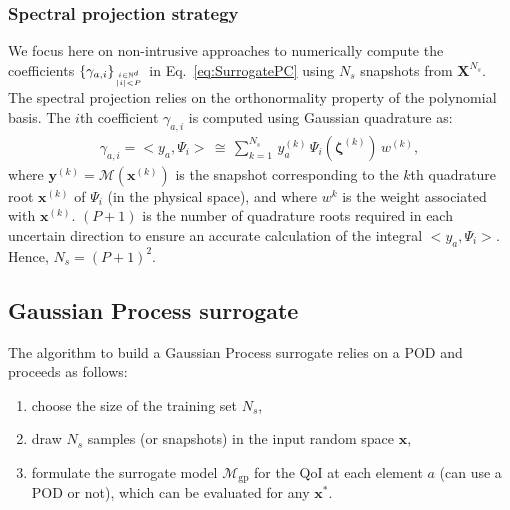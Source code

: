 \subsubsection{Spectral projection strategy}

We focus here on non-intrusive approaches to numerically compute the coefficients $\lbrace\gamma_{a,i}\rbrace_{i\in\mathbb{N}^d\atop |i|<P}$  in Eq.~\eqref{eq:SurrogatePC} using $N_{s}$ snapshots from $\mathbf{X}^{N_s}$. The spectral projection relies on the orthonormality property of the polynomial basis. The $i$th coefficient $\gamma_{a,i}$ is computed using Gaussian quadrature as:
\begin{align}
\gamma_{a,i} = <y_a,\Psi_i> \,\cong\,\displaystyle\sum_{k = 1}^{N_{s}}\,y_a^{(k)}\,\Psi_i(\boldsymbol{\zeta}^{(k)})\,w^{(k)},
\label{eq:pc_quadrature}
\end{align}
where $\mathbf{y}^{(k)} = \mathcal{M}(\mathbf{x}^{(k)})$ is the snapshot corresponding to the $k$th quadrature root $\mathbf{x}^{(k)}$ of $\Psi_i$ (in the physical space), and where $w^{k}$ is the weight associated with $\mathbf{x}^{(k)}$. $(P+1)$ is the number of quadrature roots required in each uncertain direction to ensure an accurate calculation of the integral $<y_a,\Psi_i>$. Hence, $N_{s} = (P+1)^2$.


\subsection{Gaussian Process surrogate}\label{sec:GP}

The algorithm to build a Gaussian Process surrogate relies on a POD and proceeds as follows:
\begin{enumerate}
\item choose the size of the training set $N_{s}$,
\item draw $N_{s}$ samples (or snapshots) in the input random space $\mathbf{x}$,
\item formulate the surrogate model $\mathcal{M}_{\text{gp}}$ for the QoI at each element $a$ (can use a POD or not), which can be evaluated for any $\mathbf{x}^*$.
\end{enumerate}

